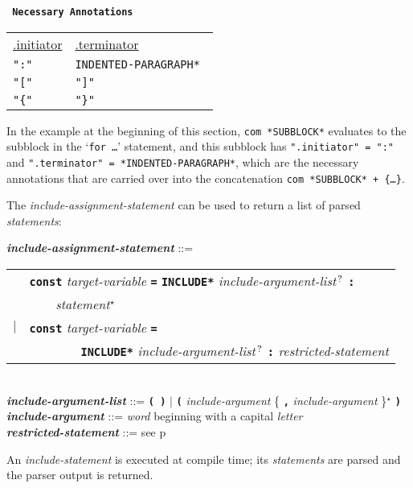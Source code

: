 \documentclass[12pt]{article}
\newcommand{\TT}[1]{{\tt \bfseries #1}}
\newcommand{\STAR}{{\Large $^\star$}}
\newcommand{\QMARK}{{$^{\,\mbox{\footnotesize ?}}$}}
\newcommand{\emkey}[1]{{\em \bfseries #1}}
\newcommand{\pagref}[1]{p\pageref{#1}}
\newenvironment{indpar}[1][0.3in]%
	{\begin{list}{}%
		     {\setlength{\itemsep}{0in}%
		      \setlength{\topsep}{0in}%
		      \setlength{\parsep}{1ex}%
		      \setlength{\labelwidth}{#1}%
		      \setlength{\leftmargin}{#1}%
		      \addtolength{\leftmargin}{\labelsep}}%
	 \item}%
	{\end{list}}
\begin{document}
\begin{center} \tt
{\rm \bf Necessary Annotations}
\\[1ex]
\begin{tabular}{l@{~~~~~~~~~~}l}
\underline{.initiator} & \underline{.terminator}
\\[1ex]
\tt ":" & \tt *INDENTED-PARAGRAPH* \\
\tt "[" & \tt "]" \\
\tt "\{" & \tt "\}" \\
\end{tabular}
\end{center}

In the example at the beginning of this section,
{\tt com *SUBBLOCK*} evaluates to the
subblock in the `{\tt for \ldots}' statement, and this subblock
has {\tt ".initiator" = ":"} and {\tt ".terminator" = *INDENTED-PARA\-GRAPH*},
which are the necessary annotations that are carried over into
the concatenation
{\tt com *SUBBLOCK* + \{\ldots\}}.

The {\em include-assignment-statement} can be used to return a list
of parsed {\em statements}:

\begin{indpar}
\emkey{include-assignment-statement}\label{INCLUDE-ASSIGNMENT-STATEMENT} ::= \\
\hspace*{0.3in}
    \begin{tabular}[t]{rl}
    & \TT{const} {\em target-variable} \TT{=} \TT{*INCLUDE*}
    	{\em include-argument-list}\QMARK{} \TT{:} \\
    & \TT{~~~~}{\em statement}\STAR{} \\
    $|$ & \TT{const} {\em target-variable} \TT{=} \\
    & ~~~~~~~~\TT{*INCLUDE*}
    	{\em include-argument-list}\QMARK{} \TT{:}
	{\em restricted-statement} \\
    \end{tabular}
\\[0.5ex]
\emkey{include-argument-list} ::= \TT{( )} $|$
	\TT{(} {\em include-argument}
	\{ \TT{,} {\em include-argument} \}\STAR{} \TT{)}
\\[0.5ex]
\emkey{include-argument} ::= {\em word} beginning with a capital {\em letter}
\\[0.5ex]
\emkey{restricted-statement} ::= see \pagref{RESTRICTED-STATEMENT}

\end{indpar}

An {\em include-statement} is executed at compile time;
its {\em statements} are parsed and the parser output is
returned.
\end{document}
